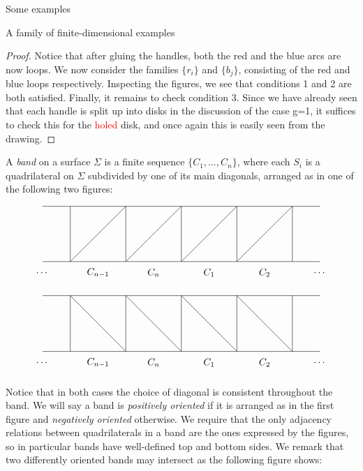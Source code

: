 \begin{chapter}{Some examples}
\begin{section}{A family of finite-dimensional examples}
\begin{proof}
Notice that after gluing the handles, both the red and the blue arcs are now loops. We now consider the families $\{r_i\}$ and $\{b_j\}$, consisting of the red and blue loops respectively. Inspecting the figures, we see that conditions 1 and 2 are both satisfied. Finally, it remains to check condition 3. Since we have already seen that each handle is split up into disks in the discussion of the case g=1, it suffices to check this for the \textcolor{red}{holed} disk, and once again this is easily seen from the drawing.
\end{proof}


A \emph{band} on a surface $\Sigma$ is a finite sequence $\{C_1, \dots, C_n\}$, where each $S_i$ is a quadrilateral on $\Sigma$ subdivided by one of its main diagonals, arranged as in one of the following two figures:

\[
\begin{tikzpicture}
\draw (-5,1) -- (5,1);
\draw (-5,-1) -- (5,-1);

\foreach \x in {-4,-2,...,4}
\draw (\x,1) -- (\x,-1);

\foreach \x in {-4,-2,...,2}
\draw (\x,-1) -- (\x+2, 1);

\node at (-5,-1.4) {$\dots$};
\node at (-3,-1.4) {$C_{n-1}$};
\node at (-1,-1.4) {$C_{n}$};
\node at (1,-1.4) {$C_{1}$};
\node at (3,-1.4) {$C_{2}$};
\node at (5,-1.4) {$\dots$};
\end{tikzpicture}
\]

\[
\begin{tikzpicture}
\draw (-5,1) -- (5,1);
\draw (-5,-1) -- (5,-1);

\foreach \x in {-4,-2,...,4}
\draw (\x,1) -- (\x,-1);

\foreach \x in {-4,-2,...,2}
\draw (\x,1) -- (\x+2, -1);

\node at (-5,-1.4) {$\dots$};
\node at (-3,-1.4) {$C_{n-1}$};
\node at (-1,-1.4) {$C_{n}$};
\node at (1,-1.4) {$C_{1}$};
\node at (3,-1.4) {$C_{2}$};
\node at (5,-1.4) {$\dots$};
\end{tikzpicture}
\]

Notice that in both cases the choice of diagonal is consistent throughout the band. We will say a band is \emph{positively oriented} if it is arranged as in the first figure and \emph{negatively oriented} otherwise. We require that the only adjacency relations between quadrilaterals in a band are the ones expressed by the figures, so in particular bands have well-defined top and bottom sides. We remark that two differently oriented bands may intersect as the following figure shows:


\end{section}
\end{chapter}

